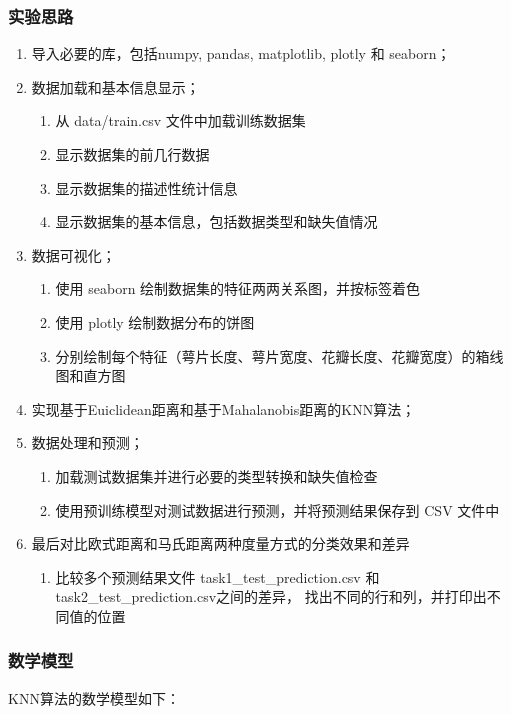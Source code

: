\documentclass[12pt]{article}
\begin{document}
\subsubsection{实验思路}
\begin{enumerate}
  \item 导入必要的库，包括numpy, pandas, matplotlib, plotly 和 seaborn；
  \item 数据加载和基本信息显示；
        \begin{enumerate}
          \item 从 data/train.csv 文件中加载训练数据集
          \item 显示数据集的前几行数据
          \item 显示数据集的描述性统计信息
          \item 显示数据集的基本信息，包括数据类型和缺失值情况
        \end{enumerate}
  \item 数据可视化；
        \begin{enumerate}
          \item 使用 seaborn 绘制数据集的特征两两关系图，并按标签着色
          \item 使用 plotly 绘制数据分布的饼图
          \item 分别绘制每个特征（萼片长度、萼片宽度、花瓣长度、花瓣宽度）的箱线图和直方图
        \end{enumerate}
  \item 实现基于Euiclidean距离和基于Mahalanobis距离的KNN算法；

  \item 数据处理和预测；
        \begin{enumerate}
          \item 加载测试数据集并进行必要的类型转换和缺失值检查
          \item 使用预训练模型对测试数据进行预测，并将预测结果保存到 CSV 文件中
        \end{enumerate}
  \item 最后对比欧式距离和马氏距离两种度量方式的分类效果和差异
        \begin{enumerate}
          \item 比较多个预测结果文件 task1\_test\_prediction.csv 和 task2\_test\_prediction.csv之间的差异，
                找出不同的行和列，并打印出不同值的位置
        \end{enumerate}
\end{enumerate}

\subsubsection{数学模型}
KNN算法的数学模型如下：
\end{document}
